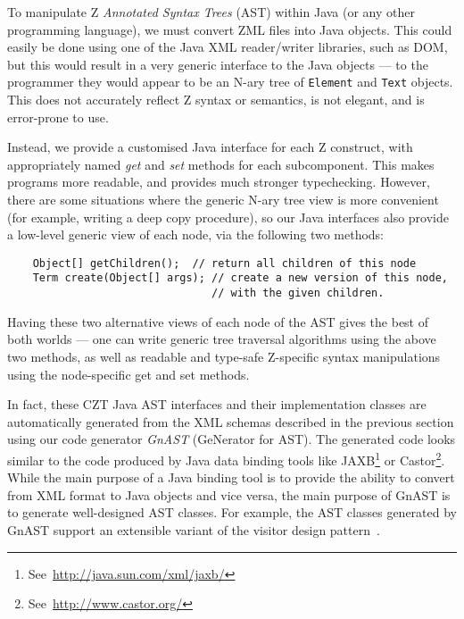 \documentclass{llncs}
\begin{document}
  To manipulate Z \emph{Annotated Syntax Trees} (AST) within Java (or
  any other programming language), we must convert ZML files into Java
  objects.  This could easily be done using one of the Java XML
  reader/writer libraries, such as DOM, but this would result in a
  very generic interface to the Java objects --- to the programmer they
  would appear to be an N-ary tree of \texttt{Element} and
  \texttt{Text} objects. This does not accurately reflect Z
  syntax or semantics, is not elegant, and is error-prone to use.

  Instead, we provide a customised Java interface for each Z
  construct, with appropriately named \emph{get} and \emph{set}
  methods for each subcomponent.  This makes programs more readable,
  and provides much stronger typechecking.  However, there are some
  situations where the generic N-ary tree view is more convenient
  (for example, writing a deep copy procedure), so our Java interfaces
  also provide a low-level generic view of each node, via the following
  two methods:
\begin{small}
\begin{verbatim}
    Object[] getChildren();  // return all children of this node
    Term create(Object[] args); // create a new version of this node,
                                // with the given children.
\end{verbatim}
\end{small}
  Having these two alternative views of each node of the AST gives
  the best of both worlds --- one can write generic tree traversal
  algorithms using the above two methods, as well as readable and
  type-safe Z-specific syntax manipulations using the node-specific
  get and set methods.

  In fact, these CZT Java AST interfaces and their implementation
  classes are automatically generated from the XML schemas described
  in the previous section using our code generator \emph{GnAST}
  (GeNerator for AST).  The generated code looks similar to the code
  produced by Java data binding tools like
  JAXB\footnote{See~\url{http://java.sun.com/xml/jaxb/}} or
  Castor\footnote{See~\url{http://www.castor.org/}}.
  While the main purpose of a Java binding tool is to
  provide the ability to convert from XML format to Java objects and
  vice versa, the main purpose of GnAST is to generate well-designed
  AST classes.  For example, the AST classes generated by GnAST
  support an extensible variant of the visitor design
  pattern~\cite{GamEA:95,MaiCha:01}.
\end{document}
